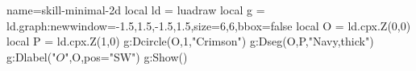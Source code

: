 \documentclass[border=5pt]{standalone}
\begin{document}
\begin{luadraw}{name=skill-minimal-2d}
local ld = luadraw
local g = ld.graph:new{window={-1.5,1.5,-1.5,1.5},size={6,6},bbox=false}
local O = ld.cpx.Z(0,0)
local P = ld.cpx.Z(1,0)
g:Dcircle(O,1,"Crimson")
g:Dseg({O,P},"Navy,thick")
g:Dlabel("$O$",O,{pos="SW"})
g:Show()
\end{luadraw}
\end{document}
